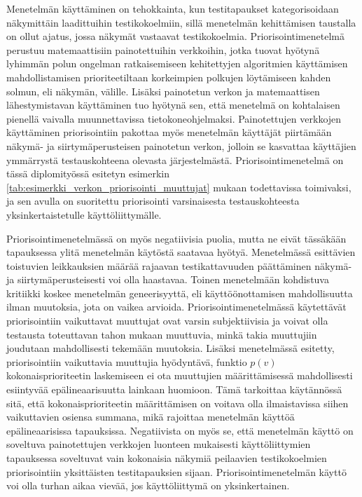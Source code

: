   Menetelmän käyttäminen on tehokkainta, kun testitapaukset kategorisoidaan näkymittäin laadittuihin testikokoelmiin, sillä menetelmän kehittämisen taustalla on ollut ajatus, jossa näkymät vastaavat testikokoelmia.
  Priorisointimenetelmä perustuu matemaattisiin painotettuihin verkkoihin, jotka tuovat hyötynä lyhimmän polun ongelman ratkaisemiseen kehitettyjen algoritmien käyttämisen mahdollistamisen prioriteetiltaan korkeimpien polkujen löytämiseen kahden solmun, eli näkymän, välille.
  Lisäksi painotetun verkon ja matemaattisen lähestymistavan käyttäminen tuo hyötynä sen, että menetelmä on kohtalaisen pienellä vaivalla muunnettavissa tietokoneohjelmaksi.
  Painotettujen verkkojen käyttäminen priorisointiin pakottaa myös menetelmän käyttäjät piirtämään näkymä- ja siirtymäperusteisen painotetun verkon, jolloin se kasvattaa käyttäjien ymmärrystä testauskohteena olevasta järjestelmästä.
  Priorisointimenetelmä on tässä diplomityössä esitetyn esimerkin \ref{tab:esimerkki_verkon_priorisointi_muuttujat} mukaan todettavissa toimivaksi, ja sen avulla on suoritettu priorisointi varsinaisesta testauskohteesta yksinkertaistetulle käyttöliittymälle.

  Priorisointimenetelmässä on myös negatiivisia puolia, mutta ne eivät tässäkään tapauksessa ylitä menetelmän käytöstä saatavaa hyötyä.
  Menetelmässä esittävien toistuvien leikkauksien määrää rajaavan testikattavuuden päättäminen näkymä- ja siirtymäperusteisesti voi olla haastavaa.
  Toinen menetelmään kohdistuva kritiikki koskee menetelmän geneerisyyttä, eli käyttöönottamisen mahdollisuutta ilman muutoksia, jota on vaikea arvioida.
  Priorisointimenetelmässä käytettävät priorisointiin vaikuttavat muuttujat ovat varsin subjektiivisia ja voivat olla testausta toteuttavan tahon mukaan muuttuvia, minkä takia muuttujiin joudutaan mahdollisesti tekemään muutoksia.
  Lisäksi menetelmässä esitetty, priorisointiin vaikuttavia muuttujia hyödyntävä, funktio \(p(v)\) kokonaisprioriteetin laskemiseen ei ota muuttujien määrittämisessä mahdollisesti esiintyvää epälineaarisuutta lainkaan huomioon.
  Tämä tarkoittaa käytännössä sitä, että kokonaisprioriteetin määrittämisen on voitava olla ilmaistavissa siihen vaikuttavien osiensa summana, mikä rajoittaa menetelmän käyttöä epälineaarisissa tapauksissa.
  Negatiivista on myös se, että menetelmän käyttö on soveltuva painotettujen verkkojen luonteen mukaisesti käyttöliittymien tapauksessa soveltuvat vain kokonaisia näkymiä peilaavien testikokoelmien priorisointiin yksittäisten testitapauksien sijaan.
  Priorisointimenetelmän käyttö voi olla turhan aikaa vievää, jos käyttöliittymä on yksinkertainen.


